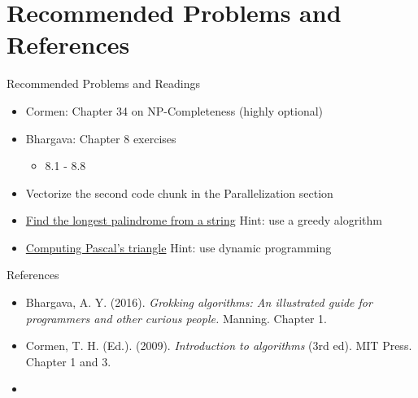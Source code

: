 \documentclass[
  ignorenonframetext,
]{beamer}
\providecommand{\tightlist}{%
  \setlength{\itemsep}{0pt}\setlength{\parskip}{0pt}}\usepackage{longtable,booktabs,array}
\begin{document}
\hypertarget{recommended-problems-and-references}{%
\section{Recommended Problems and
References}\label{recommended-problems-and-references}}

\begin{frame}{Recommended Problems and Readings}
\protect\hypertarget{recommended-problems-and-readings}{}
\begin{itemize}
\item
  Cormen: Chapter 34 on NP-Completeness (highly optional)
\item
  Bhargava: Chapter 8 exercises

  \begin{itemize}
  \tightlist
  \item
    8.1 - 8.8
  \end{itemize}
\item
  Vectorize the second code chunk in the Parallelization section
\item
  \href{https://leetcode.com/problems/longest-palindrome/}{Find the
  longest palindrome from a string} Hint: use a greedy alogrithm
\item
  \href{https://leetcode.com/problems/pascals-triangle/}{Computing
  Pascal's triangle} Hint: use dynamic programming
\end{itemize}
\end{frame}

\begin{frame}{References}
\protect\hypertarget{references}{}
\begin{itemize}
\item
  Bhargava, A. Y. (2016). \emph{Grokking algorithms: An illustrated
  guide for programmers and other curious people.} Manning. Chapter 1.
\item
  Cormen, T. H. (Ed.). (2009). \emph{Introduction to algorithms} (3rd
  ed). MIT Press. Chapter 1 and 3.
\item
\end{itemize}
\end{frame}
\end{document}
